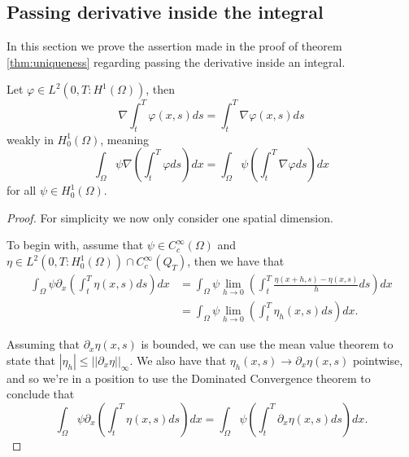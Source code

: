 \documentclass[11pt, a4paper]{article}
\begin{document}
\newpage






\newpage
\begin{appendix}
\section{Passing derivative inside the integral}
\label{sec:derivative}
In this section we prove the assertion made in the proof of theorem \ref{thm:uniqueness} regarding passing the derivative inside an integral.

\begin{lemma}
Let $\varphi \in L^2(0,T: H^1(\Omega))$, then 
\begin{equation}
\label{diff_int}
	\nabla \int_t^T \varphi(x,s)ds = \int_t^T \nabla\varphi(x,s)ds
\end{equation}
weakly in $H^1_0(\Omega)$, meaning 
\begin{equation*}
\int_\Omega \psi \nabla \left(\int_t^T \varphi ds \right) dx = \int_\Omega \psi \left(\int_t^T \nabla \varphi ds \right) dx
\end{equation*}
for all $\psi \in H^1_0(\Omega)$.
\end{lemma}

\begin{proof}

For simplicity we now only consider one spatial dimension.

To begin with, assume that $\psi \in C^{\infty}_c(\Omega)$ and $\eta \in L^2(0,T: H_0^1(\Omega))\cap C^\infty_c(Q_T)$, then we have that
\begin{align*}
\int_{\Omega}\psi \partial_x\left(\int_t^T \eta(x,s) ds\right)dx &= \int_{\Omega}\psi \lim_{h \to 0}\left(\int_t^T \frac{\eta(x+h,s)-\eta(x,s)}{h} ds\right)dx\\
&= \int_{\Omega}\psi \lim_{h \to 0}\left(\int_t^T \eta_h(x,s) ds\right)dx.
\end{align*}

Assuming that $\partial_x \eta(x,s)$ is bounded, we can use the mean value theorem to state that $|\eta_h| \leq  ||\partial_x \eta||_\infty$. We also have that $\eta_h(x,s) \to \partial_x \eta(x,s)$ pointwise, and so we're in a position to use the Dominated Convergence theorem to conclude that
\begin{equation}
\label{results_diff_first}
\int_{\Omega}\psi \partial_x\left(\int_t^T \eta(x,s) ds\right)dx = \int_{\Omega}\psi \left(\int_t^T \partial_x\eta(x,s) ds\right)dx.
\end{equation}


\end{proof}
\end{appendix}
\end{document}
